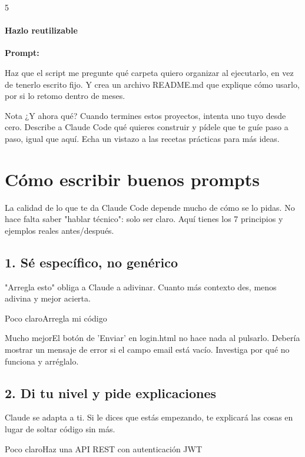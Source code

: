 \documentclass[11pt,a4paper]{report}
\begin{document}
5\subsubsection{Hazlo reutilizable}

\noindent\textbf{Prompt: }
\begin{codebox}
Haz que el script me pregunte qué carpeta quiero organizar al ejecutarlo, en vez de tenerlo escrito fijo. Y crea un archivo README.md que explique cómo usarlo, por si lo retomo dentro de meses.
\end{codebox}

\begin{calloutbox}{Nota}
¿Y ahora qué? Cuando termines estos proyectos, intenta uno tuyo desde cero. Describe a Claude Code qué quieres construir y pídele que te guíe paso a paso, igual que aquí. Echa un vistazo a las recetas prácticas para más ideas.\end{calloutbox}


\chapter{Cómo escribir buenos prompts}

La calidad de lo que te da Claude Code depende mucho de cómo se lo pidas. No hace falta saber "hablar técnico": solo ser claro. Aquí tienes los 7 principios y ejemplos reales antes/después.

\section{1. Sé específico, no genérico}

"Arregla esto" obliga a Claude a adivinar. Cuanto más contexto des, menos adivina y mejor acierta.

 Poco claroArregla mi código

 Mucho mejorEl botón de 'Enviar' en login.html no hace nada al pulsarlo. Debería mostrar un mensaje de error si el campo email está vacío. Investiga por qué no funciona y arréglalo.

\section{2. Di tu nivel y pide explicaciones}

Claude se adapta a ti. Si le dices que estás empezando, te explicará las cosas en lugar de soltar código sin más.

 Poco claroHaz una API REST con autenticación JWT
\end{document}
